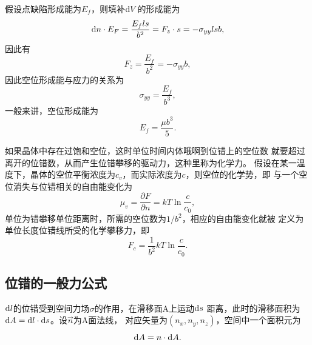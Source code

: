                     假设点缺陷形成能为$E_f$，则填补$\mathop{}\!\mathrm{d} V$的形成能为
                    \begin{equation}
                        \mathop{}\!\mathrm{d} n\cdot E_F=\frac{E_f ls}{b^2}=F_z\cdot s=-\sigma_{yy}lsb,
                    \end{equation}
                    因此有
                    \begin{equation}
                        F_z=\frac{E_f}{b^2}=-\sigma_{yy}b,
                    \end{equation}
                    因此空位形成能与应力的关系为
                    \begin{equation}
                        \sigma_{yy}=\frac{E_f}{b^3},
                    \end{equation}
                    一般来讲，空位形成能为
                    \begin{equation}
                        E_f=\frac{\mu b^3}{5}.
                    \end{equation}

                    如果晶体中存在过饱和空位，这时单位时间内体哦啊到位错上的空位数
                    就要超过离开的位错数，从而产生位错攀移的驱动力，这种里称为化学力。
                    假设在某一温度下，晶体的空位平衡浓度为$c_v$，而实际浓度为$c$，则空位的化学势，即
                    与一个空位消失与位错相关的自由能变化为
                    \begin{equation}
                        \mu_v=\frac{\partial F}{\partial n}=kT\ln\frac{c}{c_0},
                    \end{equation}
                    单位为错攀移单位距离时，所需的空位数为$1/b^2$，相应的自由能变化就被
                    定义为单位长度位错线所受的化学攀移力，即
                    \begin{equation}
                        F_c=\frac{1}{b^2}kT\ln\frac{c}{c_0}.
                    \end{equation}
                \subsection{位错的一般力公式}
                    $\mathop{}\!\mathrm{d} l$的位错受到空间力场$\sigma$的作用，在滑移面A上运动$\mathop{}\!\mathrm{d} s$
                    距离，此时的滑移面积为$\mathop{}\!\mathrm{d} A=\mathop{}\!\mathrm{d} l\cdot\mathop{}\!\mathrm{d} s$。设$\vec{n}$为A面法线，
                    对应矢量为$(n_x,n_y,n_z)$，空间中一个面积元为
                    \begin{equation}
                        \mathop{}\!\mathrm{d} A =n \cdot\mathop{}\!\mathrm{d} A.
                    \end{equation}
                    
